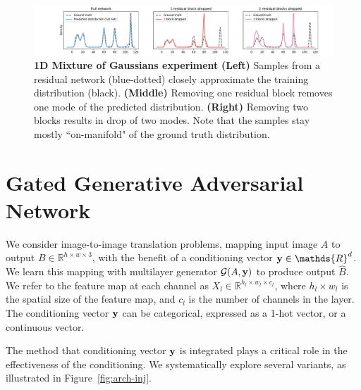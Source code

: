 
\begin{figure}[t]
    \centering
    \includegraphics[width=\linewidth,trim={2.2cm 0 1.8cm 0},clip]{paper_images/mog.pdf}
    \caption{{\bf 1D Mixture of Gaussians experiment} {\bf (Left)} Samples from a residual network (blue-dotted) closely approximate the training distribution (black). {\bf (Middle)} Removing one residual block removes one mode of the predicted distribution. {\bf (Right)} Removing two blocks results in drop of two modes. Note that the samples stay mostly ``on-manifold" of the ground truth distribution.
    }\label{fig:onedexperiment}
\end{figure}

\section{Gated Generative Adversarial Network}
\label{sec:methods}
We consider image-to-image translation problems, mapping input image $A$ to output $B \in \mathds{R}^{h\times w\times 3}$, with the benefit of a conditioning vector ${\bf y} \in \mathds{R}^{d}$. We learn this mapping with multilayer generator $\mathcal{G}(A,{\bf y})$ to produce output $\widehat{B}$. We refer to the feature map at each channel as $X_l\in \mathds{R}^{h_l\times w_l\times c_l}$, where $h_l \times w_l$ is the spatial size of the feature map, and $c_l$ is the number of channels in the layer. 
The conditioning vector ${\bf y}$ can be categorical, expressed as a 1-hot vector, or a continuous vector. 


The method that conditioning vector ${\bf y}$ is integrated plays a critical role in the effectiveness of the conditioning. We systematically explore several variants, as illustrated in Figure~\ref{fig:arch-inj}.


